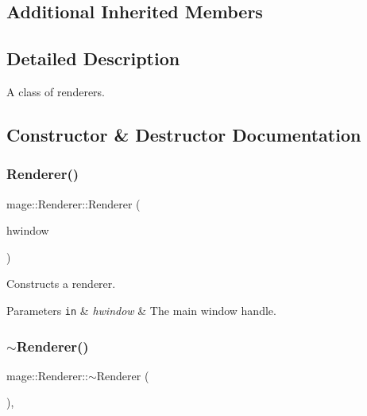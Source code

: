 \subsection*{Additional Inherited Members}


\subsection{Detailed Description}
A class of renderers. 

\subsection{Constructor \& Destructor Documentation}
\hypertarget{classmage_1_1_renderer_a762dcda433c319af237d1dfd9bc6095f}{}\label{classmage_1_1_renderer_a762dcda433c319af237d1dfd9bc6095f} 
\subsubsection{\texorpdfstring{Renderer()}{Renderer()}}
{\footnotesize\ttfamily mage\+::\+Renderer\+::\+Renderer (\begin{DoxyParamCaption}\item[{H\+W\+ND}]{hwindow }\end{DoxyParamCaption})\hspace{0.3cm}{\ttfamily [protected]}}

Constructs a renderer.


\begin{DoxyParams}[1]{Parameters}
\mbox{\tt in}  & {\em hwindow} & The main window handle. \\
\hline
\end{DoxyParams}
\hypertarget{classmage_1_1_renderer_a997e041f28cc71d069d1ab7d29fe6ced}{}\label{classmage_1_1_renderer_a997e041f28cc71d069d1ab7d29fe6ced} 
\subsubsection{\texorpdfstring{$\sim$\+Renderer()}{~Renderer()}}
{\footnotesize\ttfamily mage\+::\+Renderer\+::$\sim$\+Renderer (\begin{DoxyParamCaption}{ }\end{DoxyParamCaption})\hspace{0.3cm}{\ttfamily [protected]}, {\ttfamily [virtual]}}

